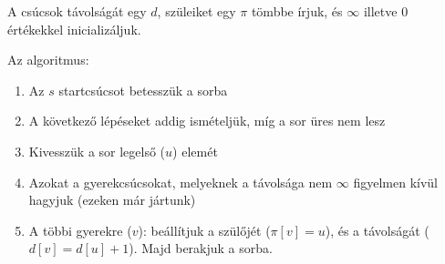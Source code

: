 \documentclass[margin=0px]{article}
\begin{document}
A csúcsok távolságát egy $d$, szüleiket egy $\pi$ tömbbe írjuk, és $\infty$ illetve $0$ értékekkel inicializáljuk.

Az algoritmus:
\begin{enumerate}
    \item Az $s$ startcsúcsot betesszük a sorba
    \item A következő lépéseket addig ismételjük, míg a sor üres nem lesz
    \item Kivesszük a sor legelső ($u$) elemét
    \item Azokat a gyerekcsúcsokat, melyeknek a távolsága nem $\infty$ figyelmen kívül hagyjuk (ezeken már jártunk)
    \item A többi gyerekre ($v$): beállítjuk a szülőjét ($\pi[v] = u$), és a távolságát ($d[v] = d[u]+1$). Majd berakjuk a sorba.
\end{enumerate}
\end{document}
